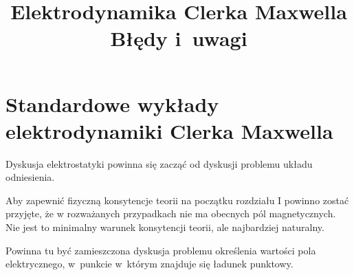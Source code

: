 \documentclass[a4paper,11pt]{article}
\title{Elektrodynamika Clerka Maxwella \\
  Błędy i~uwagi}
\begin{document}





\maketitle %





\section{Standardowe wykłady elektrodynamiki Clerka Maxwella}

\vspace{\spaceTwo}








Dyskusja elektrostatyki powinna się zacząć od dyskusji problemu układu
odniesienia.

\vspace{\spaceFour}



Aby zapewnić fizyczną konsytencje teorii na początku rozdziału I
powinno zostać przyjęte, że w rozważanych przypadkach nie ma obecnych
pól magnetycznych. Nie jest to minimalny warunek konsytencji teorii,
ale najbardziej naturalny.

\vspace{\spaceFour}








 Powinna tu być zamieszczona dyskusja problemu określenia wartości
pola elektrycznego, w~punkcie w~którym znajduje się ładunek punktowy.
\end{document}
